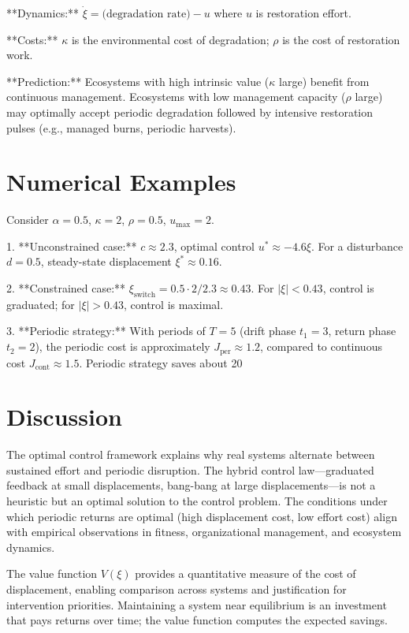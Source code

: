 \documentclass[12pt]{article}
\begin{document}
**Dynamics:** $\dot{\xi} = \text{(degradation rate)} - u$ where $u$ is restoration effort.

**Costs:** $\kappa$ is the environmental cost of degradation; $\rho$ is the cost of restoration work.

**Prediction:** Ecosystems with high intrinsic value ($\kappa$ large) benefit from continuous management. Ecosystems with low management capacity ($\rho$ large) may optimally accept periodic degradation followed by intensive restoration pulses (e.g., managed burns, periodic harvests).

\section{Numerical Examples}

Consider $\alpha = 0.5$, $\kappa = 2$, $\rho = 0.5$, $u_{\max} = 2$.

1. **Unconstrained case:** $c \approx 2.3$, optimal control $u^* \approx -4.6 \xi$. For a disturbance $d = 0.5$, steady-state displacement $\xi^* \approx 0.16$.

2. **Constrained case:** $\xi_{\text{switch}} = 0.5 \cdot 2 / 2.3 \approx 0.43$. For $|\xi| < 0.43$, control is graduated; for $|\xi| > 0.43$, control is maximal.

3. **Periodic strategy:** With periods of $T = 5$ (drift phase $t_1 = 3$, return phase $t_2 = 2$), the periodic cost is approximately $J_{\text{per}} \approx 1.2$, compared to continuous cost $J_{\text{cont}} \approx 1.5$. Periodic strategy saves about 20%

\section{Discussion}

The optimal control framework explains why real systems alternate between sustained effort and periodic disruption. The hybrid control law—graduated feedback at small displacements, bang-bang at large displacements—is not a heuristic but an optimal solution to the control problem. The conditions under which periodic returns are optimal (high displacement cost, low effort cost) align with empirical observations in fitness, organizational management, and ecosystem dynamics.

The value function $V(\xi)$ provides a quantitative measure of the cost of displacement, enabling comparison across systems and justification for intervention priorities. Maintaining a system near equilibrium is an investment that pays returns over time; the value function computes the expected savings.
\end{document}
